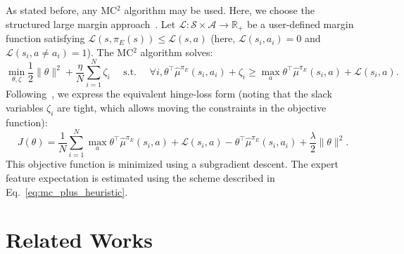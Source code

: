 \documentclass[english,utf8]{./hermes-journal}
\newcommand{\s}{\mathcal{S}}
\newcommand{\A}{\mathcal{A}}
\newcommand{\lc}{\mathcal{L}}
\begin{document}
As stated before, any MC$^2$ algorithm may be used. Here, we choose
the structured large margin approach~\cite{Taskar:2005}. Let
$\lc:\s\times\A\rightarrow\mathbb{R}_+$ be a user-defined margin
function satisfying $\lc(s,\pi_E(s))\leq \lc(s,a)$ (here,
$\lc(s_i,a_i)=0$ and $\lc(s_i,a\neq a_i)=1$). The MC$^2$ algorithm
solves:%
\begin{equation}
  \min_{\theta,\zeta}\frac{1}{2}\|\theta\|^2 +
  \frac{\eta}{N}\sum_{i=1}^N \zeta_i \text{~~~~s.t.~~~~} \forall i,
  \theta^\top\hat{\mu}^{\pi_E}(s_i,a_i)+\zeta_i \geq \max_a \theta^\top
  \hat{\mu}^{\pi_E}(s_i,a) + \lc(s_i,a). \label{eq:qp_taskar}
\end{equation}
Following~\cite{Ratliff:2006}, we express the equivalent hinge-loss
form (noting that the slack variables $\zeta_i$ are tight, which
allows moving the constraints in the objective function):
\begin{equation}
  J(\theta) = \frac{1}{N}\sum_{i=1}^N \max_a \theta^\top
  \hat{\mu}^{\pi_E}(s_i,a) + \lc(s_i,a) -
  \theta^\top\hat{\mu}^{\pi_E}(s_i,a_i) +
  \frac{\lambda}{2}\|\theta\|^2.
\end{equation}
This objective function is minimized using a subgradient descent.
The expert feature expectation is estimated using the scheme
described in Eq.~\eqref{eq:mc_plus_heuristic}.


\section{Related Works}
\label{sec:relatedWorks}
\end{document}
